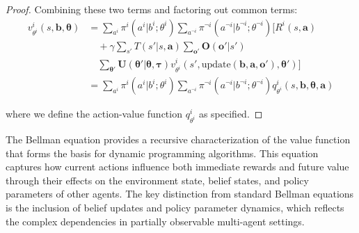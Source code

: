 \begin{proof}
    Combining these two terms and factoring out common terms:
    \begin{align}
        v^{i}_{\theta^i}(s, \boldsymbol{b}, \boldsymbol{\theta}) & = \sum_{a^i}\pi^{i}(a^{i}|b^{i}; \theta^{i}) \sum_{a^{\neg i}}\pi^{\neg i}(a^{\neg i}|b^{\neg i}; \theta^{\neg i}) \Bigg[ R^{i}(s, \boldsymbol{a}) \nonumber                                                                   \\
                                                                 & \quad + \gamma \sum_{s'}T(s'|s, \boldsymbol{a}) \sum_{\boldsymbol{o}'}\boldsymbol{O}(\boldsymbol{o}'|s') \nonumber                                                                                                             \\
                                                                 & \quad \sum_{\boldsymbol{\theta}'}\boldsymbol{U}(\boldsymbol{\theta}'|\boldsymbol{\theta}, \boldsymbol{\tau}) v^{i}_{\theta^i}(s', \text{update}(\boldsymbol{b}, \boldsymbol{a}, \boldsymbol{o}'), \boldsymbol{\theta}') \Bigg] \\
                                                                 & = \sum_{a^i}\pi^{i}(a^{i}|b^{i}; \theta^{i}) \sum_{a^{\neg i}}\pi^{\neg i}(a^{\neg i}|b^{\neg i}; \theta^{\neg i}) q^{i}_{\theta^i}(s, \boldsymbol{b}, \boldsymbol{\theta}, \boldsymbol{a})
    \end{align}

    where we define the action-value function $q^{i}_{\theta^i}$ as specified.
\end{proof}The Bellman equation provides a recursive characterization of the
value function that forms the basis for dynamic programming algorithms. This equation
captures how current actions influence both immediate rewards and future value through
their effects on the environment state, belief states, and policy parameters of other
agents. The key distinction from standard Bellman equations is the inclusion of
belief updates and policy parameter dynamics, which reflects the complex dependencies
in partially observable multi-agent settings.
